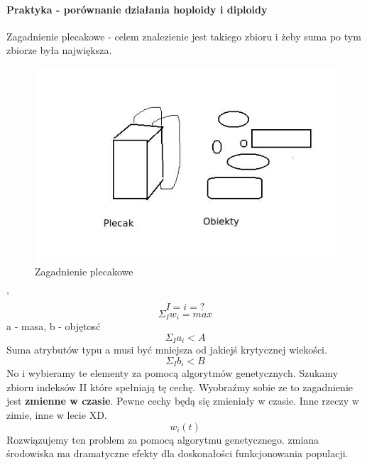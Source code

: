 \documentclass{article}
\begin{document}
		\paragraph{Praktyka - porównanie działania hoploidy i diploidy}
		Zagadnienie plecakowe - celem znalezienie jest takiego zbioru i żeby suma po tym zbiorze była największa.
		\begin{figure}[ht]
			\label{fig:fig2}
			\centering
			\includegraphics[scale=0.5]{plecak.jpeg}
			\caption{Zagadnienie plecakowe}
		\end{figure}
		'$$I={i}=?$$
		$$\Sigma_{I} w_i = max$$
		a - masa, b - objętosć
		$$\Sigma_{I} a_i < A$$
		Suma atrybutów typu a musi być mniejsza od jakiejś krytycznej wiekości.
		$$\Sigma_{I} b_i < B$$
		No i wybieramy te elementy za pomocą algorytmów genetycznych.
		Szukamy zbioru indeksów II które spełniają tę cechę. Wyobraźmy sobie ze to zagadnienie jest \textbf{zmienne w czasie}. Pewne cechy będą się zmieniały w czasie. Inne rzeczy w zimie, inne w lecie XD. 
		$$w_i(t)$$
		Rozwiązujemy ten problem za pomocą algorytmu genetycznego. zmiana środowiska ma dramatyczne efekty dla doskonałości funkcjonowania populacji. 
		
\end{document}
